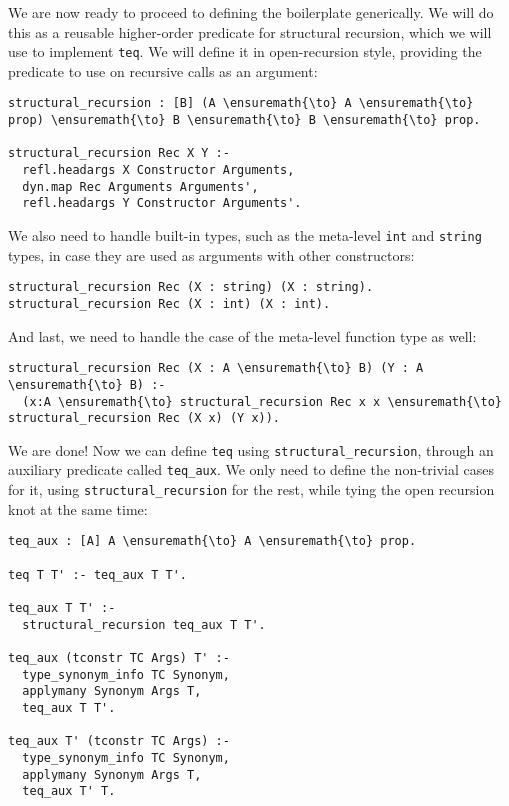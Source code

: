 We are now ready to proceed to defining the boilerplate generically. We
will do this as a reusable higher-order predicate for structural
recursion, which we will use to implement \texttt{teq}. We will define
it in open-recursion style, providing the predicate to use on recursive
calls as an argument:

\begin{verbatim}
structural_recursion : [B] (A \ensuremath{\to} A \ensuremath{\to} prop) \ensuremath{\to} B \ensuremath{\to} B \ensuremath{\to} prop.

structural_recursion Rec X Y :-
  refl.headargs X Constructor Arguments,
  dyn.map Rec Arguments Arguments',
  refl.headargs Y Constructor Arguments'.
\end{verbatim}

We also need to handle built-in types, such as the meta-level
\texttt{int} and \texttt{string} types, in case they are used as
arguments with other constructors:

\begin{verbatim}
structural_recursion Rec (X : string) (X : string).
structural_recursion Rec (X : int) (X : int).
\end{verbatim}

And last, we need to handle the case of the meta-level function type as
well:

\begin{verbatim}
structural_recursion Rec (X : A \ensuremath{\to} B) (Y : A \ensuremath{\to} B) :-
  (x:A \ensuremath{\to} structural_recursion Rec x x \ensuremath{\to} structural_recursion Rec (X x) (Y x)).
\end{verbatim}

We are done! Now we can define \texttt{teq} using
\texttt{structural\_recursion}, through an auxiliary predicate called
\texttt{teq\_aux}. We only need to define the non-trivial cases for it,
using \texttt{structural\_recursion} for the rest, while tying the open
recursion knot at the same time:

\begin{verbatim}
teq_aux : [A] A \ensuremath{\to} A \ensuremath{\to} prop.

teq T T' :- teq_aux T T'.

teq_aux T T' :-
  structural_recursion teq_aux T T'.

teq_aux (tconstr TC Args) T' :-
  type_synonym_info TC Synonym,
  applymany Synonym Args T,
  teq_aux T T'.

teq_aux T' (tconstr TC Args) :-
  type_synonym_info TC Synonym,
  applymany Synonym Args T,
  teq_aux T' T.
\end{verbatim}

